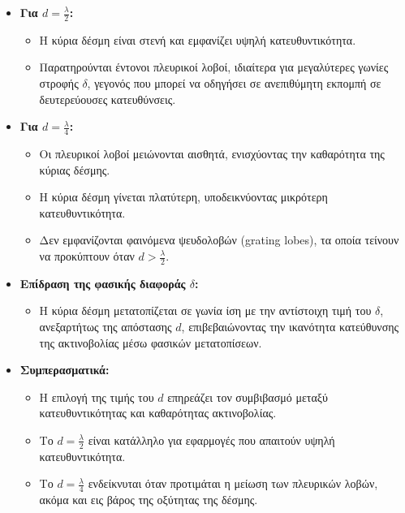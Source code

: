 \documentclass[a4paper,12pt]{report}
\newcommand{\en}{\selectlanguage{english}}
\newcommand{\gr}{\selectlanguage{greek}}
\begin{document}
\begin{itemize}
    \item \textbf{Για \( d = \frac{\lambda}{2} \):}
    \begin{itemize}
        \item Η κύρια δέσμη είναι στενή και εμφανίζει υψηλή κατευθυντικότητα.
        \item Παρατηρούνται έντονοι πλευρικοί λοβοί, ιδιαίτερα για μεγαλύτερες γωνίες στροφής \( \delta \), γεγονός που μπορεί να οδηγήσει σε ανεπιθύμητη εκπομπή σε δευτερεύουσες κατευθύνσεις.
    \end{itemize}

    \item \textbf{Για \( d = \frac{\lambda}{4} \):}
    \begin{itemize}
        \item Οι πλευρικοί λοβοί μειώνονται αισθητά, ενισχύοντας την καθαρότητα της κύριας δέσμης.
        \item Η κύρια δέσμη γίνεται πλατύτερη, υποδεικνύοντας μικρότερη κατευθυντικότητα.
        \item Δεν εμφανίζονται φαινόμενα ψευδολοβών (\en grating lobes\gr), τα οποία τείνουν να προκύπτουν όταν \( d > \frac{\lambda}{2} \).
    \end{itemize}

    \item \textbf{Επίδραση της φασικής διαφοράς \( \delta \):}
    \begin{itemize}
        \item Η κύρια δέσμη μετατοπίζεται σε γωνία ίση με την αντίστοιχη τιμή του \( \delta \), ανεξαρτήτως της απόστασης \( d \), επιβεβαιώνοντας την ικανότητα κατεύθυνσης της ακτινοβολίας μέσω φασικών μετατοπίσεων.
    \end{itemize}

    \item \textbf{Συμπερασματικά:}
    \begin{itemize}
        \item Η επιλογή της τιμής του \( d \) επηρεάζει τον συμβιβασμό μεταξύ κατευθυντικότητας και καθαρότητας ακτινοβολίας.
        \item Το \( d = \frac{\lambda}{2} \) είναι κατάλληλο για εφαρμογές που απαιτούν υψηλή κατευθυντικότητα.
        \item Το \( d = \frac{\lambda}{4} \) ενδείκνυται όταν προτιμάται η μείωση των πλευρικών λοβών, ακόμα και εις βάρος της οξύτητας της δέσμης.
    \end{itemize}
\end{itemize}
\end{document}
